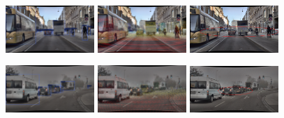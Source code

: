 \documentclass[report.tex]{subfiles}
\begin{document}

        \begin{figure}[ht!]
            \centering
            \includegraphics[width=0.3\textwidth]{images/datasets/dense/samples/day/2018-02-05_12-07-39_00300.png}\hfill
            \includegraphics[width=0.3\textwidth]{images/datasets/dense/samples/day/clean_LiDAR.png}\hfill
            \includegraphics[width=0.3\textwidth]{images/datasets/dense/samples/day/clean_Radar_annotated.png}
          
            \includegraphics[width=0.3\textwidth]{images/datasets/dense/samples/light_fog/2018-10-08_08-10-40_02160.png}\hfill
            \includegraphics[width=0.3\textwidth]{images/datasets/dense/samples/light_fog/light_fog_LiDAR.png}\hfill
            \includegraphics[width=0.3\textwidth]{images/datasets/dense/samples/light_fog/light_fog_Radar_ann.png}
          

\end{figure}
\end{document}
